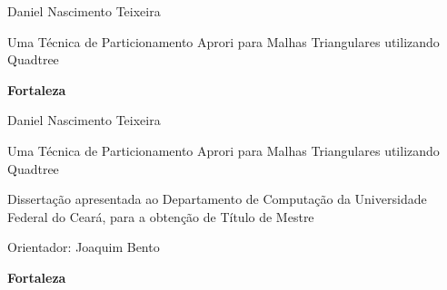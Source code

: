 \pagestyle{empty}

\begin{titlepage}


\begin{center}
{\LARGE Daniel Nascimento Teixeira}
\par
\vspace{200pt}
{\Huge Uma Técnica de Particionamento Aprori para Malhas Triangulares utilizando Quadtree}
\par
\vfill
\textbf{{\large Fortaleza}\\
{\large \the\year}}
\end{center}
\end{titlepage}

\cleardoublepage

\pagestyle{fancy}



\thispagestyle{empty}

\begin{center}
{\LARGE Daniel Nascimento Teixeira}
\par
\vspace{200pt}
{\Huge Uma Técnica de Particionamento Aprori para Malhas Triangulares utilizando Quadtree}
\end{center}
\par
\vspace{90pt}
\hspace*{175pt}\parbox{7.6cm}{{\large Dissertação apresentada ao Departamento de Computação da Universidade Federal do Ceará, para a obtenção de Título de Mestre}}

\par
\vspace{1em}
\hspace*{175pt}\parbox{7.6cm}{{\large Orientador: Joaquim Bento}}

\par
\vfill
\begin{center}
\textbf{{\large Fortaleza}\\
{\large \the\year}}
\end{center}


